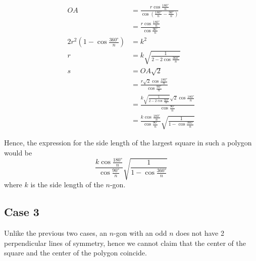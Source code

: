 \documentclass[12pt]{scrartcl}
\begin{document}
\begin{align*}
	OA                                             & = \frac{r \cos \frac{\ang{180}}{n}}{\cos \left(\frac{\ang{180}}{n} - \frac{\ang{90}}{n}\right)}                   \\
	                                               & = \frac{r \cos \frac{\ang{180}}{n}}{\cos \frac{\ang{90}}{n}}                                                      \\
	2r^2 \left(1 - \cos \frac{\ang{360}}{n}\right) & = k^2                                                                                                             \\
	r                                              & = k\sqrt{\frac{1}{2 - 2\cos\frac{\ang{360}}{n}}}                                                                  \\
	s                                              & = OA\sqrt{2}                                                                                                      \\
	                                               & = \frac{r \sqrt{2} \cos \frac{\ang{180}}{n}}{\cos \frac{\ang{90}}{n}}                                             \\
	                                               & =\frac{k\sqrt{\frac{1}{2 - 2\cos\frac{\ang{360}}{n}}} \sqrt{2} \cos \frac{\ang{180}}{n}}{\cos \frac{\ang{90}}{n}} \\
	                                               & = \frac{k \cos \frac{\ang{180}}{n}}{\cos \frac{\ang{90}}{n}}\sqrt{\frac{1}{1 - \cos\frac{\ang{360}}{n}}}
\end{align*}

Hence, the expression for the side length of the largest square in such a polygon would be
\begin{equation}
	\frac{k \cos \frac{\ang{180}}{n}}{\cos \frac{\ang{90}}{n}}\sqrt{\frac{1}{1 - \cos\frac{\ang{360}}{n}}}
\end{equation}
where $k$ is the side length of the $n$-gon.

\pagebreak

\subsection{Case 3}
Unlike the previous two cases, an $n$-gon with an odd $n$ does not have 2 perpendicular lines of symmetry, hence we cannot claim that the center of the square and the center of the polygon coincide.
\end{document}
